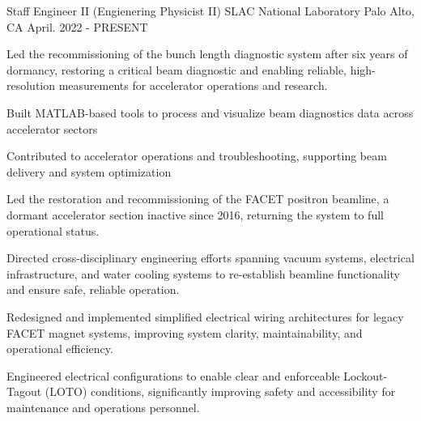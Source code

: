 \vspace{-3mm}


\begin{cventries}


\cventry
{Staff Engineer II (Engienering Physicist II)} %
{SLAC National Laboratory} %
{Palo Alto, CA} %
{April. 2022 - PRESENT} %
{ %
\begin{cvitems}
\item {Led the recommissioning of the bunch length diagnostic system after six years of dormancy, restoring a critical beam diagnostic and enabling reliable, high-resolution measurements for accelerator operations and research.}
\item {Built MATLAB-based tools to process and visualize beam diagnostics data across accelerator sectors}
\item {Contributed to accelerator operations and troubleshooting, supporting beam delivery and system optimization}
\item {Led the restoration and recommissioning of the FACET positron beamline, a dormant accelerator section inactive since 2016, returning the system to full operational status.}
\item {Directed cross-disciplinary engineering efforts spanning vacuum systems, electrical infrastructure, and water cooling systems to re-establish beamline functionality and ensure safe, reliable operation.}
\item {Redesigned and implemented simplified electrical wiring architectures for legacy FACET magnet systems, improving system clarity, maintainability, and operational efficiency.}
\item {Engineered electrical configurations to enable clear and enforceable Lockout-Tagout (LOTO) conditions, significantly improving safety and accessibility for maintenance and operations personnel.}
\end{cvitems}
}
\vspace{3mm}


\end{cventries}
